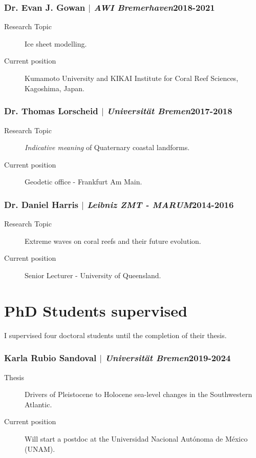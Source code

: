 \documentclass[11pt]{article}
\begin{document}
\smallskip
\subsubsection{Dr. Evan J. Gowan $|$ {\normalfont\textit{AWI Bremerhaven}}\hfill 2018-2021}
{\footnotesize 
\begin{description}
  \item [Research Topic] Ice sheet modelling. 
  \item [Current position] Kumamoto University and KIKAI Institute for Coral Reef Sciences, Kagoshima, Japan. 
\end{description}
}
\smallskip
\subsubsection{Dr. Thomas Lorscheid $|$ {\normalfont\textit{Universität Bremen}}\hfill 2017-2018}
{\footnotesize 
\begin{description}
  \item [Research Topic] \textit{Indicative meaning} of Quaternary coastal landforms. 
  \item [Current position] Geodetic office - Frankfurt Am Main. 
\end{description}
}

\smallskip
\subsubsection{Dr. Daniel Harris $|$ {\normalfont\textit{Leibniz ZMT - MARUM}}\hfill 2014-2016}
{\footnotesize 
\begin{description}
  \item [Research Topic] Extreme waves on coral reefs and their future evolution. 
  \item [Current position] Senior Lecturer - University of Queensland. 
\end{description}
}

\section{PhD Students supervised}
{\normalfont I supervised four doctoral students until the completion of their thesis.}\\

\subsubsection{Karla Rubio Sandoval $|$ {\normalfont\textit{Universität Bremen}}\hfill 2019-2024}
{\footnotesize 
\begin{description}
  \item [Thesis] Drivers of Pleistocene to Holocene sea-level changes in the Southwestern Atlantic.
  \item [Current position] Will start a postdoc at the Universidad Nacional Autónoma de México (UNAM). 
\end{description}
}
\smallskip
\end{document}
